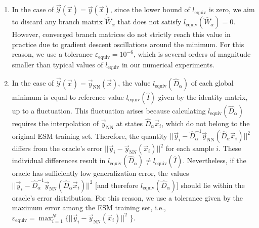 \begin{enumerate}
  \item In the case of $\vec{\mathcal{Y}} (\vec{x}) = \vec{y}(\vec{x})$, since the lower bound of $l_{\mathrm{equiv}}$ is zero, we aim to discard any branch matrix $\hat{W}_{\alpha}$ that does not satisfy $l_{\mathrm{equiv}} (\hat{W}_{\alpha}) = 0$. However, converged branch matrices do not strictly reach this value in practice due to gradient descent oscillations around the minimum. For this reason, we use a tolerance $\varepsilon_{\mathrm{equiv}} = 10^{-6}$, which is several orders of magnitude smaller than typical values of $l_{\mathrm{equiv}}$ in our numerical experiments.
  
  \item In the case of $\vec{\mathcal{Y}} (\vec{x}) = \vec{y}_{\mathrm{NN}} (\vec{x})$, the value $l_{\mathrm{equiv}} (\hat{D}_{\alpha})$ of each global minimum is equal to reference value $l_{\mathrm{equiv}}(\hat{I})$ given by the identity matrix, up to a fluctuation. This fluctuation arises because calculating $l_{\mathrm{equiv}} (\hat{D}_{\alpha})$ requires the interpolation of $\vec{y}_{\mathrm{NN}}$ at states $\hat{D}_{\alpha}\vec{x}_i$, which do not belong to the original ESM training set. Therefore, the quantity $|| \vec{y}_i - \hat{D}_{\alpha}^{-1} \vec{y}_{\mathrm{NN}} (\hat{D}_{\alpha}\vec{x}_i)||^2$ differs from the oracle's error $|| \vec{y}_i - \vec{y}_{\mathrm{NN}} (\vec{x}_i)||^2$ for each sample $i$. These individual differences result in $l_{\mathrm{equiv}} (\hat{D}_{\alpha}) \neq l_{\mathrm{equiv}}(\hat{I})$. Nevertheless, if the oracle has sufficiently low generalization error, the values $|| \vec{y}_i - \hat{D}_{\alpha}^{-1} \vec{y}_{\mathrm{NN}} (\hat{D}_{\alpha}\vec{x}_i)||^2$ [and therefore $l_{\mathrm{equiv}} (\hat{D}_{\alpha})$] should lie within the oracle's error distribution. For this reason, we use a tolerance given by the maximum error among the ESM training set, i.e., $\varepsilon_{\mathrm{equiv}} = \max_{i = 1}^N  \{ || \vec{y}_i - \vec{y}_{\mathrm{NN}} (\vec{x}_i)||^2$ \}.
\end{enumerate}


